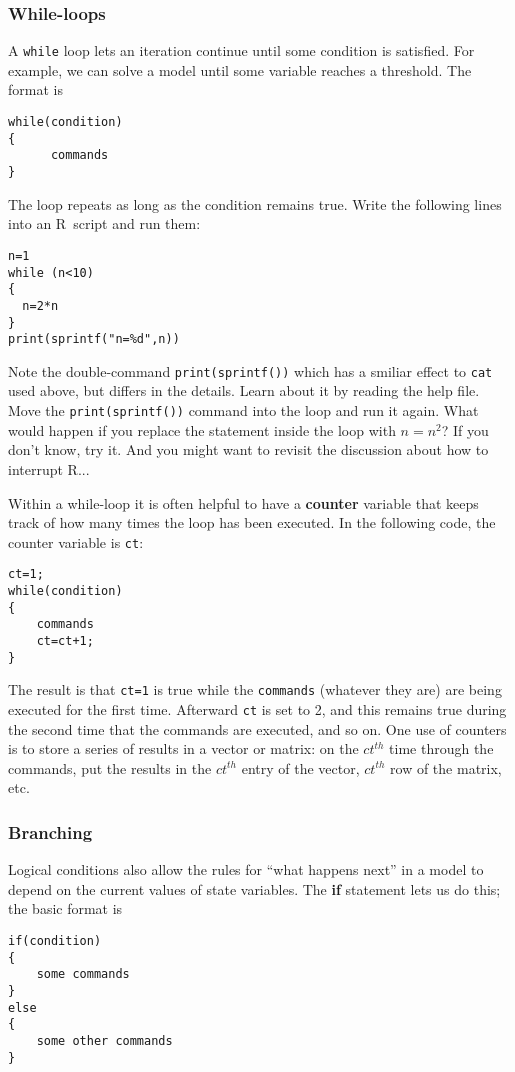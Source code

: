 \documentclass [11pt]{article}
\newcommand{\code}[1]{{\tt #1}}
\newcommand\R{{\sf R}}
\numberwithin{exercise}{section}
\begin{document}
\subsubsection{While-loops} 
A \code{while} loop lets an iteration continue until 
some condition is satisfied. For example, we can solve a model until some 
variable reaches a threshold. The format is
\begin{verbatim}
while(condition)
{
      commands
}
\end{verbatim}
The loop repeats as long as the condition remains true. Write the following lines into an \R\ script and run them:
\begin{verbatim}
n=1
while (n<10)
{
  n=2*n
}
print(sprintf("n=%d",n))
\end{verbatim}
Note the double-command \code{print(sprintf())} which has a smiliar effect to \code{cat} used above, but differs in the details. 
Learn about it by reading the help file. Move the \code{print(sprintf())} command into the loop and run it again. What would happen if you replace the statement inside the loop with \code{$n=n^2$}? If you don't know, try it. And you might want to revisit the discussion about how to interrupt \R...
 
Within a while-loop it is often helpful to have a \textbf{counter} variable
that keeps track of how many times the loop has been executed. 
In the following code, the counter variable is \texttt{ct}: 
\begin{verbatim}
ct=1; 
while(condition) 
{
    commands
    ct=ct+1; 	
}
\end{verbatim}
The result is that \texttt{ct=1} is true while the \texttt{commands} (whatever they are)
are being executed for the first time. Afterward \texttt{ct} is set to 2, and this remains
true during the second time that the commands are executed, and so on. One use of counters
is to store a series of results in a vector or matrix: on the $ct^{th}$
time through the commands, put the results in the $ct^{th}$ entry of the vector, $ct^{th}$ row
of the matrix, etc.  


\subsubsection{Branching}
Logical conditions also allow the rules for ``what happens next'' in a model 
to depend on the current values of state variables. The \textbf{if} 
statement lets us do this; the basic format is 
\begin{verbatim}
if(condition) 
{
    some commands
}
else
{
    some other commands
}
\end{verbatim}
\end{document}

